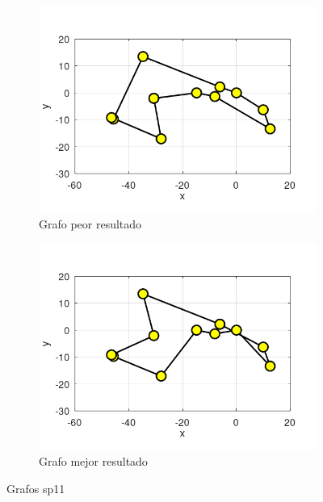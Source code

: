\documentclass[12pt, a4paper]{article}
\begin{document}
\begin{figure}[H]
    \centering
    \begin{subfigure}[b]{0.45\textwidth}
        \centering
        \includegraphics[width=\textwidth]{img/sp11-worst-graph.png}
        \caption{Grafo peor resultado}
        \label{fig:sp11-worst-graph}
    \end{subfigure}
    \hfill
    \begin{subfigure}[b]{0.45\textwidth}
        \centering
        \includegraphics[width=\textwidth]{img/sp11-best-graph.png}
        \caption{Grafo mejor resultado}
        \label{fig:sp11-best-graph}
    \end{subfigure}
    \caption{Grafos sp11}
    \label{fig:sp11-graphs}
\end{figure}
\end{document}
